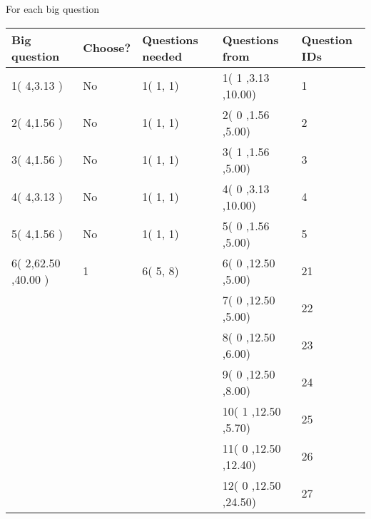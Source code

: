 \documentclass[12pt]{article}
\begin{document}
   
 \newpage
   
{\LARGE{For each big question}}
   
   
\vspace{0.2in}
   
   
\noindent\hspace{-0.4in}\begin{tabular}{|l|l|l|l|l|}
\hline
 Big question & Choose? & Questions needed & Questions from & Question IDs \\ 
\hline
           1(          4,3.13
 ) &  No   & 
           1(          1,           1) &           1(          1
,3.13
 ,10.00) &           1 \\
 \hline
           2(          4,1.56
 ) &  No   & 
           1(          1,           1) &           2(          0
,1.56
 ,5.00) &           2 \\
 \hline
           3(          4,1.56
 ) &  No   & 
           1(          1,           1) &           3(          1
,1.56
 ,5.00) &           3 \\
 \hline
           4(          4,3.13
 ) &  No   & 
           1(          1,           1) &           4(          0
,3.13
 ,10.00) &           4 \\
 \hline
           5(          4,1.56
 ) &  No   & 
           1(          1,           1) &           5(          0
,1.56
 ,5.00) &           5 \\
 \hline
           6(          2,62.50
,40.00
 ) &           1 & 
           6(          5,           8) &           6(          0
,12.50
 ,5.00) &          21 \\
  & & &           7(          0
 ,12.50
 ,5.00) &          22 \\
  & & &           8(          0
 ,12.50
 ,6.00) &          23 \\
  & & &           9(          0
 ,12.50
 ,8.00) &          24 \\
  & & &          10(          1
 ,12.50
 ,5.70) &          25 \\
  & & &          11(          0
 ,12.50
 ,12.40) &          26 \\
  & & &          12(          0
 ,12.50
 ,24.50) &          27 \\
 \hline
 \end{tabular}
   
   
 \vspace{0.2in}
   
\end{document}
